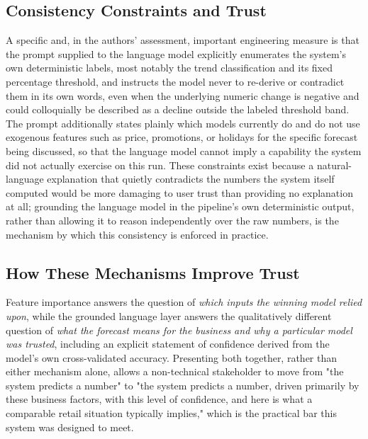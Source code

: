 \subsection{Consistency Constraints and Trust}
A specific and, in the authors' assessment, important engineering measure is that the prompt supplied to the language model explicitly enumerates the system's own deterministic labels, most notably the trend classification and its fixed percentage threshold, and instructs the model never to re-derive or contradict them in its own words, even when the underlying numeric change is negative and could colloquially be described as a decline outside the labeled threshold band. The prompt additionally states plainly which models currently do and do not use exogenous features such as price, promotions, or holidays for the specific forecast being discussed, so that the language model cannot imply a capability the system did not actually exercise on this run. These constraints exist because a natural-language explanation that quietly contradicts the numbers the system itself computed would be more damaging to user trust than providing no explanation at all; grounding the language model in the pipeline's own deterministic output, rather than allowing it to reason independently over the raw numbers, is the mechanism by which this consistency is enforced in practice.

\subsection{How These Mechanisms Improve Trust}
Feature importance answers the question of \emph{which inputs the winning model relied upon}, while the grounded language layer answers the qualitatively different question of \emph{what the forecast means for the business and why a particular model was trusted}, including an explicit statement of confidence derived from the model's own cross-validated accuracy. Presenting both together, rather than either mechanism alone, allows a non-technical stakeholder to move from "the system predicts a number" to "the system predicts a number, driven primarily by these business factors, with this level of confidence, and here is what a comparable retail situation typically implies," which is the practical bar this system was designed to meet.
